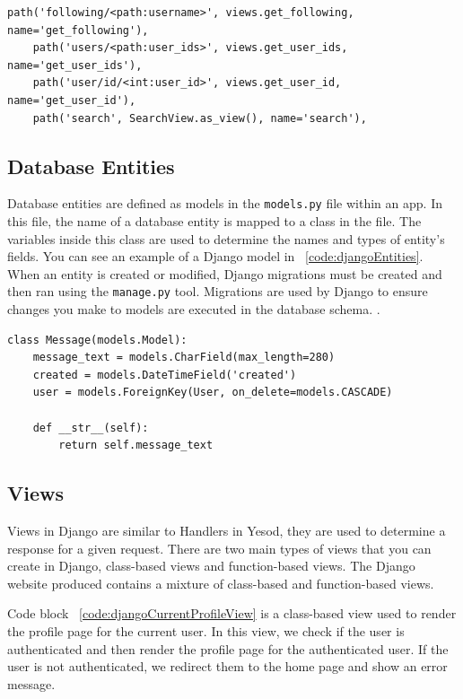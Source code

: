 
\begin{lstlisting}[caption={An extract of Django routes},label={code:djangoRoutes}]
	path('following/<path:username>', views.get_following, name='get_following'),
	path('users/<path:user_ids>', views.get_user_ids, name='get_user_ids'),
	path('user/id/<int:user_id>', views.get_user_id, name='get_user_id'),
	path('search', SearchView.as_view(), name='search'),
\end{lstlisting}

\subsection{Database Entities}

Database entities are defined as models in the \texttt{models.py} file within an app.
In this file, the name of a database entity is mapped to a class in the file. The variables inside
this class are used to determine the names and types of entity's fields. You can see
an example of a Django model in ~\ref{code:djangoEntities}. When an entity is created 
or modified, Django migrations must be created and then ran using the \texttt{manage.py} tool. 
Migrations are used by Django to ensure changes you make to models are executed in 
the database schema. \parencite{djangoMigrations}.

\begin{lstlisting}[caption={The user entity in Django},label={code:djangoEntities}]
	class Message(models.Model):
	message_text = models.CharField(max_length=280)
	created = models.DateTimeField('created')
	user = models.ForeignKey(User, on_delete=models.CASCADE)

	def __str__(self):
		return self.message_text
\end{lstlisting}

\subsection{Views}

Views in Django are similar to Handlers in Yesod, they are used to determine
a response for a given request. There are two main types of views that you can
create in Django, class-based views and function-based views. The Django website
produced contains a mixture of class-based and function-based views.

Code block ~\ref{code:djangoCurrentProfileView} is a class-based view used to
render the profile page for the current user. In this view, we check if the
user is authenticated and then render the profile page for the authenticated
user. If the user is not authenticated, we redirect them to the home page and
show an error message.

